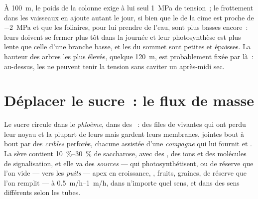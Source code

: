 \begin{example}\label{ex:b1:plant-transport:top}
À \qty{100}{m}, le poids de la colonne exige à lui seul \qty{1}{MPa} de
tension~; le frottement dans les vaisseaux en ajoute autant le jour, si
bien que le  de la cime est proche de \qty{-2}{MPa} et que les
 foliaires, pour lui prendre de l'eau, sont plus basses
encore~: leurs  doivent se fermer plus tôt dans la journée et
leur photosynthèse est plus lente que celle d'une branche basse, et les
 du sommet sont petites et épaisses. La hauteur des arbres les
plus élevés, quelque \qty{120}{m}, est probablement fixée par là~:
au-dessus, les  ne peuvent tenir la tension sans caviter un
après-midi sec.
\end{example}

\section{Déplacer le sucre~: le flux de masse}

\begin{definition}\label{def:b1:plant-transport:phloem}
Le sucre circule dans le \emph{phloème}, dans des \emph{}~: des files de  vivantes qui ont perdu leur noyau et
la plupart de leurs  mais gardent leurs membranes, jointes
bout à bout par des \emph{cribles} perforés, chacune assistée d'une
\emph{ compagne} qui lui fournit  et . La sève
contient \qtyrange{10}{30}{\%} de saccharose, avec des ,
des ions et des molécules de signalisation, et elle va des
\emph{sources} ---  qui photosynthétisent, ou  de
réserve que l'on vide --- vers les \emph{puits} --- apex en croissance,
, fruits, graines,  de réserve que l'on remplit --- à
\qtyrange{0.5}{1}{m/h}, dans n'importe quel sens, et dans des sens
différents selon les tubes.
\end{definition}

